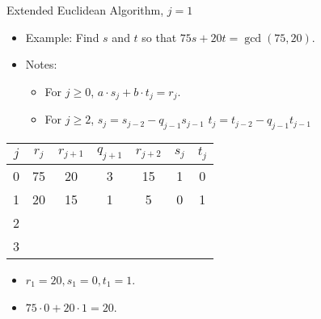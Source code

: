 \documentclass[handout]{beamer}
\begin{document}
\begin{frame}{Extended Euclidean Algorithm, $j=1$}

\begin{itemize}
  \item Example: Find $s$ and $t$ so that $75s+20t = \gcd(75, 20)$.
  \item Notes:
  \begin{itemize}
    \item For $j\geq0$, $a \cdot s_j + b \cdot t_j = r_j$.
    \item For $j\geq 2$, $s_j=s_{j-2} - q_{j-1}s_{j-1}$ \quad $t_j=t_{j-2} - q_{j-1}t_{j-1}$
  \end{itemize}
\end{itemize}

\vspace{1em}

\begin{tabular}{|c|c|c|c|c|c|c|}\hline
$j$   &  $r_{j}$    & $r_{j+1}$ & $q_{j+1}$ & $r_{j+2}$ & $s_j$ & $t_j$ \\ \hline\hline
0     &  75         &  20       &    3      &   15      &  1    &   0   \\ \hline
1     &  20         &  15       &    1      &    5      &  0    &   1   \\ \hline
2     &             &           &           &           &       &       \\ \hline
3     &             &           &           &           &       &       \\ \hline
\end{tabular}

\vspace{1em}

\begin{itemize}
  \item $r_1 = 20, s_1=0, t_1=1$.
  \item $75\cdot 0 + 20 \cdot 1 = 20$.
\end{itemize}

\end{frame}
\end{document}
